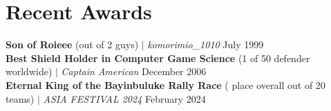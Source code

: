 \documentclass[letterpaper, 11pt]{article}
\begin{document}
	\section{Recent Awards}
	\begin{itemize}[leftmargin=0.15in, label={}]
		\small{\item{
				\textbf{Son of Roieee}\hspace{1pt} (out of 2 guys) $|$ \emph{komorimio\_1010} \hspace*{\fill} July 1999 \\
				\textbf{Best Shield Holder in Computer Game Science}\hspace{1pt} (1 of 50 defender worldwide) $|$ \emph{Captain American} \hspace*{\fill} December 2006 \\
				\textbf{Eternal King of the Bayinbuluke Rally Race}\hspace{1pt} ( place overall out of 20 teams) $|$ \emph{ASIA FESTIVAL 2024} \hspace*{\fill} February 2024 \\
		}}
	\end{itemize}
	
\end{document}
